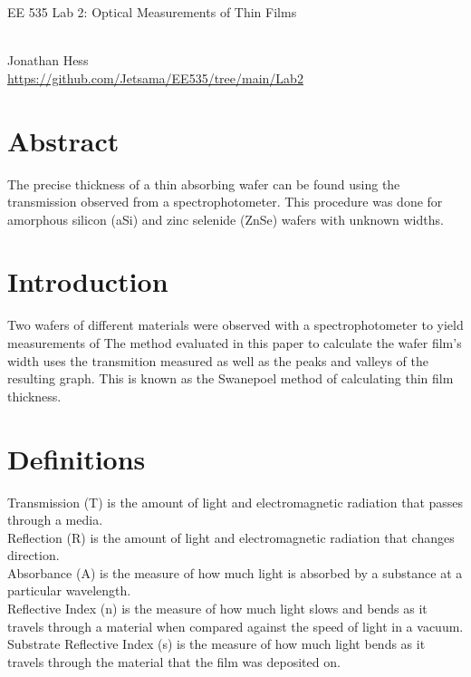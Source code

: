 \documentclass[10pt,a4paper]{article}
\begin{document}
\begin{multicols}{2}
\newenvironment{indentPar}[1]%
 {\begin{list}{}%
         {\setlength{\leftmargin}{#1}}%
         \item[]%
 }
 {\end{list}}

\begin{flushleft}
\begin{LARGE}EE 535 Lab 2: Optical Measurements of Thin Films
\end{LARGE}
\\Jonathan Hess
\\\href{https://github.com/Jetsama/EE535/tree/main/Lab2}{https://github.com/Jetsama/EE535/tree/main/Lab2}
\end{flushleft}


\section*{Abstract}

The precise thickness of a thin absorbing wafer can be found using the transmission observed from a spectrophotometer. This procedure was done for amorphous silicon (aSi) and zinc selenide (ZnSe) wafers with unknown widths.





\section*{Introduction}

Two wafers of different materials were observed with a spectrophotometer to yield measurements of The method evaluated in this paper to calculate the wafer film's width uses the transmition measured as well as the peaks and valleys of the resulting graph. This is known as the Swanepoel method of calculating thin film thickness.



\section*{Definitions}
Transmission (T) is the amount of light and electromagnetic radiation that passes through a media.\\
Reflection (R) is the amount of light and electromagnetic radiation that changes direction. \\
Absorbance (A) is the measure of how much light is absorbed by a substance at a particular wavelength.\\
Reflective Index (n) is the measure of how much light slows and bends as it travels through a material when compared against the speed of light in a vacuum.
Substrate Reflective Index (s) is the measure of how much light bends as it travels through the material that the film was deposited on.
	

\end{multicols}
\end{document}

